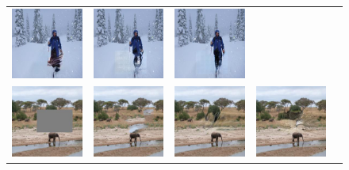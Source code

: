 \begin{figure}[h!]
\begin{tabular}{ccccc}
\includegraphics[width=.2\textwidth]{figures/random/000000266409_sig.jpg}&
\includegraphics[width=.2\textwidth]{figures/random/000000266409_g.jpg}&
\includegraphics[width=.2\textwidth]{figures/random/000000266409.jpg}\\
\includegraphics[width=.2\textwidth]{figures/random/000000286994_ip.jpg}&
\includegraphics[width=.2\textwidth]{figures/random/000000286994_pm.jpg}&
\includegraphics[width=.2\textwidth]{figures/random/000000286994_sig.jpg}&
\includegraphics[width=.2\textwidth]{figures/random/000000286994_g.jpg}&

\end{tabular}
\end{figure}
